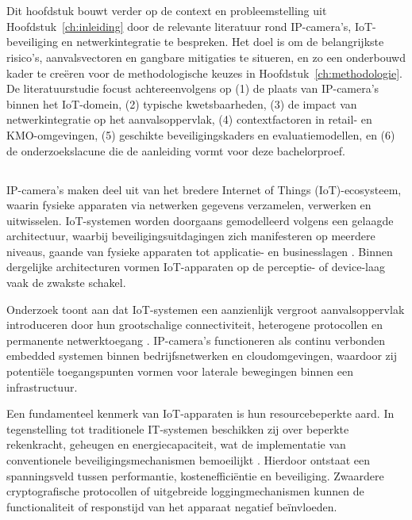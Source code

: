 \chapter{}%
\label{ch:stand-van-zaken}

Dit hoofdstuk bouwt verder op de context en probleemstelling uit Hoofdstuk~\ref{ch:inleiding} door de relevante literatuur rond IP-camera’s, IoT-beveiliging en netwerkintegratie te bespreken. Het doel is om de belangrijkste risico’s, aanvalsvectoren en gangbare mitigaties te situeren, en zo een onderbouwd kader te creëren voor de methodologische keuzes in Hoofdstuk~\ref{ch:methodologie}. De literatuurstudie focust achtereenvolgens op (1) de plaats van IP-camera’s binnen het IoT-domein, (2) typische kwetsbaarheden, (3) de impact van netwerkintegratie op het aanvalsoppervlak, (4) contextfactoren in retail- en KMO-omgevingen, (5) geschikte beveiligingskaders en evaluatiemodellen, en (6) de onderzoekslacune die de aanleiding vormt voor deze bachelorproef.

\section{}%
\label{sec:camera-iot}

IP-camera’s maken deel uit van het bredere Internet of Things (IoT)-ecosysteem, waarin fysieke apparaten via netwerken gegevens verzamelen, verwerken en uitwisselen. IoT-systemen worden doorgaans gemodelleerd volgens een gelaagde architectuur, waarbij beveiligingsuitdagingen zich manifesteren op meerdere niveaus, gaande van fysieke apparaten tot applicatie- en businesslagen \autocite{Butun2019arXivIoTSecurity,rajmohandecade}. Binnen dergelijke architecturen vormen IoT-apparaten op de perceptie- of device-laag vaak de zwakste schakel.

Onderzoek toont aan dat IoT-systemen een aanzienlijk vergroot aanvalsoppervlak introduceren door hun grootschalige connectiviteit, heterogene protocollen en permanente netwerktoegang \autocite{MOHAMADNOOR2019283,rajmohandecade}. IP-camera’s functioneren als continu verbonden embedded systemen binnen bedrijfsnetwerken en cloudomgevingen, waardoor zij potentiële toegangspunten vormen voor laterale bewegingen binnen een infrastructuur.

Een fundamenteel kenmerk van IoT-apparaten is hun resourcebeperkte aard. In tegenstelling tot traditionele IT-systemen beschikken zij over beperkte rekenkracht, geheugen en energiecapaciteit, wat de implementatie van conventionele beveiligingsmechanismen bemoeilijkt \autocite{fysarakis2014embedded,kumar2024review}. Hierdoor ontstaat een spanningsveld tussen performantie, kostenefficiëntie en beveiliging. Zwaardere cryptografische protocollen of uitgebreide loggingmechanismen kunnen de functionaliteit of responstijd van het apparaat negatief beïnvloeden.

